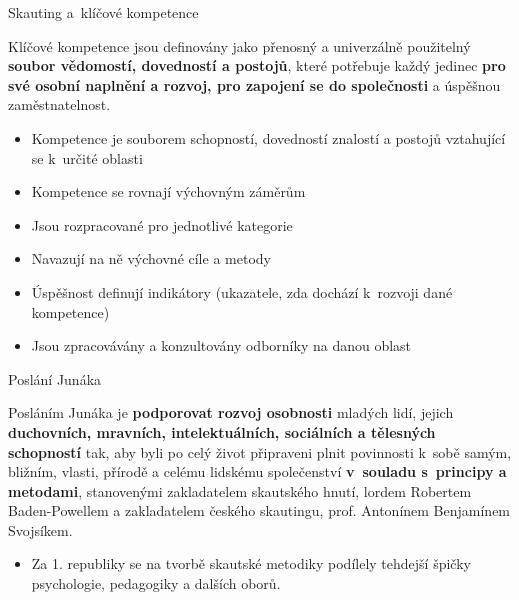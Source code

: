 \documentclass[compress,utf8,xcolor=dvipsnames]{beamer}
\begin{document}
\begin{frame}{Skauting a~klíčové kompetence}
\begin{center}
Klíčové kompetence jsou definovány jako přenosný a univerzálně použitelný \textbf{soubor vědomostí, dovedností a postojů}, které potřebuje každý jedinec \textbf{pro své osobní naplnění a rozvoj, pro zapojení se do společnosti} a úspěšnou zaměstnatelnost.
\end{center}
\begin{itemize}
\item Kompetence je souborem schopností, dovedností znalostí a postojů vztahující se k~určité oblasti
\item Kompetence se rovnají výchovným záměrům
\item Jsou rozpracované pro jednotlivé kategorie
\item Navazují na ně výchovné cíle a metody
\item Úspěšnost definují indikátory (ukazatele, zda dochází k~rozvoji dané kompetence)
\item Jsou zpracovávány a konzultovány odborníky na danou oblast
\end{itemize}
\end{frame}

\begin{frame}{Poslání Junáka}
\begin{center}
\begin{Large}
Posláním Junáka je \textbf{podporovat rozvoj osobnosti} mladých lidí, jejich \textbf{duchovních, mravních, intelektuálních, sociálních a tělesných schopností} tak, aby byli po celý život připraveni plnit povinnosti k~sobě samým, bližním, vlasti, přírodě a celému lidskému společenství \textbf{v~souladu s~principy a metodami}, stanovenými zakladatelem skautského hnutí, lordem Robertem Baden-Powellem a zakladatelem českého skautingu, prof. Antonínem Benjamínem Svojsíkem.
\end{Large}
\end{center}
\begin{itemize}
\item Za 1. republiky se na tvorbě skautské metodiky podílely tehdejší špičky psychologie, pedagogiky a dalších oborů.
\end{itemize}
\end{frame}
\end{document}
